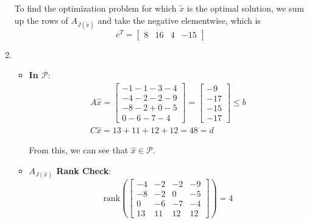 \documentclass[12pt]{article}
\begin{document}
\begin{enumerate}
            To find the optimization problem for which $\tilde{x}$ is the optimal solution,
            we sum up the rows of $A_{J(\tilde{x})}$ and take the negative elementwise, which is
            \[c^{T}=\left[\begin{array}{llll}
                              8 & 16 & 4 & -15
                        \end{array}\right]\]
            \label{list:find-c}
      \item \begin{itemize}
                  \item \textbf{In $\mathcal{P}$}:
                        \begin{gather*}
                              A \hat{x}=\left[\begin{array}{l}
                                          -1-1-3-4 \\
                                          -4-2-2-9 \\
                                          -8-2+0-5 \\
                                          0-6-7-4
                                    \end{array}\right]=\left[\begin{array}{c}
                                          -9  \\
                                          -17 \\
                                          -15 \\
                                          -17
                                    \end{array}\right] \leq b \\
                              C \hat{x}=13+11+12+12=48=d
                        \end{gather*}

                        From this, we can see that $\hat{x} \in \mathcal{P}$.
                  \item \textbf{$A_{J(\hat{x})}$ Rank Check}:
                        \[\text{rank}\left(\left[\begin{array}{cccc}
                                          -4 & -2 & -2 & -9 \\
                                          -8 & -2 & 0  & -5 \\
                                          0  & -6 & -7 & -4 \\
                                          13 & 11 & 12 & 12
                                    \end{array}\right]\right)=4\]


\end{itemize}
\end{enumerate}
\end{document}
